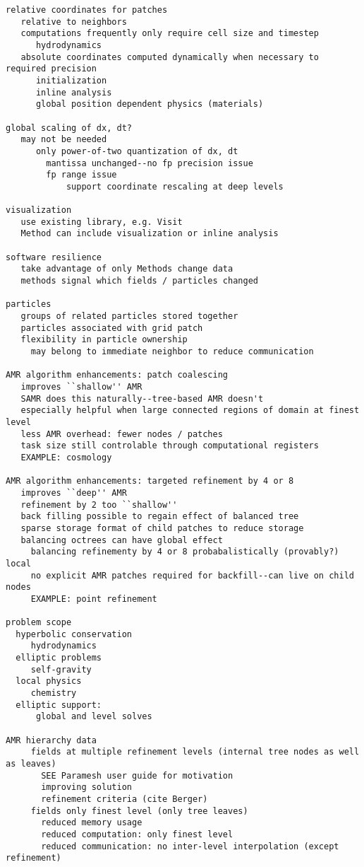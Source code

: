 \documentclass[14pt]{article}
\begin{document}
\begin{verbatim}
relative coordinates for patches   
   relative to neighbors
   computations frequently only require cell size and timestep
      hydrodynamics
   absolute coordinates computed dynamically when necessary to required precision
      initialization
      inline analysis
      global position dependent physics (materials)

global scaling of dx, dt?
   may not be needed
      only power-of-two quantization of dx, dt
        mantissa unchanged--no fp precision issue
        fp range issue
            support coordinate rescaling at deep levels
        
visualization
   use existing library, e.g. Visit
   Method can include visualization or inline analysis

software resilience
   take advantage of only Methods change data
   methods signal which fields / particles changed

particles
   groups of related particles stored together
   particles associated with grid patch
   flexibility in particle ownership
     may belong to immediate neighbor to reduce communication

AMR algorithm enhancements: patch coalescing
   improves ``shallow'' AMR
   SAMR does this naturally--tree-based AMR doesn't
   especially helpful when large connected regions of domain at finest level
   less AMR overhead: fewer nodes / patches
   task size still controlable through computational registers
   EXAMPLE: cosmology

AMR algorithm enhancements: targeted refinement by 4 or 8
   improves ``deep'' AMR
   refinement by 2 too ``shallow''
   back filling possible to regain effect of balanced tree
   sparse storage format of child patches to reduce storage 
   balancing octrees can have global effect
     balancing refinementy by 4 or 8 probabalistically (provably?) local
     no explicit AMR patches required for backfill--can live on child nodes 
     EXAMPLE: point refinement

problem scope
  hyperbolic conservation
     hydrodynamics
  elliptic problems
     self-gravity
  local physics
     chemistry
  elliptic support:
      global and level solves

AMR hierarchy data
     fields at multiple refinement levels (internal tree nodes as well as leaves)
       SEE Paramesh user guide for motivation
       improving solution
       refinement criteria (cite Berger)
     fields only finest level (only tree leaves)
       reduced memory usage
       reduced computation: only finest level
       reduced communication: no inter-level interpolation (except refinement)


\end{verbatim}
\end{document}
